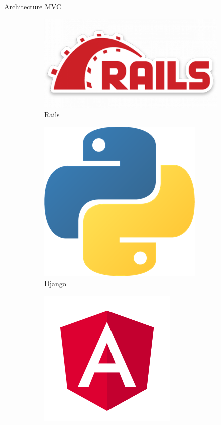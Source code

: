 \documentclass[xcolor=table]{beamer}
\begin{document}
\begin{frame}{Architecture MVC}
\begin{figure}
    \centering
    \begin{subfigure}{0.22\linewidth}
        \centering
        \includegraphics[scale=0.1]{fig/rails.png}
        \caption*{Rails}
    \end{subfigure}
    \begin{subfigure}{0.22\linewidth}
        \centering
        \includegraphics[scale=0.1]{fig/django.png}
        \caption*{Django}
    \end{subfigure}
    \begin{subfigure}{0.22\linewidth}
        \centering
        \includegraphics[scale=0.09]{fig/angular.png}

\end{subfigure}
\end{figure}
\end{frame}
\end{document}
